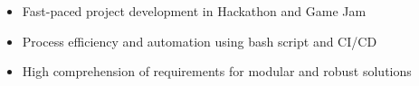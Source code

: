 \bigskip
\medskip



\begin{itemize}
	\item[\faAngleRight] Fast-paced project development in Hackathon and Game Jam
	\item[\faAngleRight] Process efficiency and automation using bash script and CI/CD
	\item[\faAngleRight] High comprehension of requirements for modular and robust solutions \par
\end{itemize}

\smallskip
\divider

\hfill
{}\hfill
{}\par
\smallskip
{}\hfill
{}\hfill
{}\hfill
{}\par
